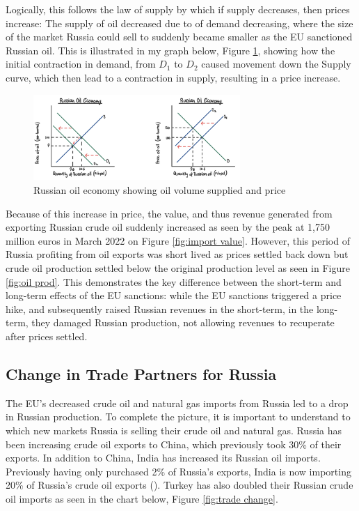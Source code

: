 \documentclass[12pt]{article}
\begin{document}
Logically, this follows the law of supply by which if supply decreases, then prices increase: The supply of oil decreased due to of demand decreasing, where the size of the market Russia could sell to suddenly became smaller as the EU sanctioned Russian oil. This is illustrated in my graph below, Figure \ref{fig:ds}, showing how the initial contraction in demand, from $D_1$ to $D_2$ caused movement down the Supply curve, which then lead to a contraction in supply, resulting in a price increase. 

\begin{figure}[h]
    \centering
    \includegraphics[width=0.7\textwidth]{images/a graph ds.jpg}
    \caption{Russian oil economy showing oil volume supplied and price}
    \label{fig:ds}
\end{figure}

Because of this increase in price, the value, and thus revenue generated from exporting Russian crude oil suddenly increased as seen by the peak at 1,750 million euros in March 2022 on Figure \ref{fig:import value}. However, this period of Russia profiting from oil exports was short lived as prices settled back down but crude oil production settled below the original production level as seen in Figure \ref{fig:oil prod}. This demonstrates the key difference between the short-term and long-term effects of the EU sanctions: while the EU sanctions triggered a price hike, and subsequently raised Russian revenues in the short-term, in the long-term, they damaged Russian production, not allowing revenues to recuperate after prices settled. 

\subsection{Change in Trade Partners for Russia}

The EU's decreased crude oil and natural gas imports from Russia led to a drop in Russian production. To complete the picture, it is important to understand to which new markets Russia is selling their crude oil and natural gas. Russia has been increasing crude oil exports to China, which previously took 30\% of their exports. In addition to China, India has increased its Russian oil imports. Previously having only purchased 2\% of Russia's exports, India is now importing 20\% of Russia's crude oil exports (\citeauthor{iea}). Turkey has also doubled their Russian crude oil imports as seen in the chart below, Figure \ref{fig:trade change}.
\end{document}
